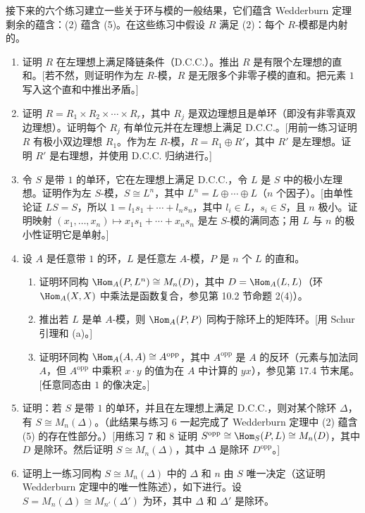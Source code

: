 接下来的六个练习建立一些关于环与模的一般结果，它们蕴含 Wedderburn 定理剩余的蕴含：(2) 蕴含 (5)。在这些练习中假设 $R$ 满足 (2)：每个 $R$-模都是内射的。
\begin{enumerate}[label=\arabic*.,resume]
  \item 证明 $R$ 在左理想上满足降链条件（D.C.C.）。推出 $R$ 是有限个左理想的直和。[若不然，则证明作为左 $R$-模，$R$ 是无限多个非零子模的直和。把元素 $1$ 写入这个直和中推出矛盾。]
  \item 证明 $R=R_1\times R_2\times\cdots\times R_r$，其中 $R_j$ 是双边理想且是单环（即没有非零真双边理想）。证明每个 $R_j$ 有单位元并在左理想上满足 D.C.C.。[用前一练习证明 $R$ 有极小双边理想 $R_1$。作为左 $R$-模，$R=R_1\oplus R'$，其中 $R'$ 是左理想。证明 $R'$ 是右理想，并使用 D.C.C. 归纳进行。]
  \item 令 $S$ 是带 $1$ 的单环，它在左理想上满足 D.C.C.，令 $L$ 是 $S$ 中的极小左理想。证明作为左 $S$-模，$S\cong L^n$，其中 $L^n=L\oplus\cdots\oplus L$（$n$ 个因子）。[由单性论证 $LS=S$，所以 $1=l_1s_1+\cdots+l_ns_n$，其中 $l_i\in L$，$s_i\in S$，且 $n$ 极小。证明映射 $(x_1,
  \ldots,x_n)\mapsto x_1s_1+\cdots+x_ns_n$ 是左 $S$-模的满同态；用 $L$ 与 $n$ 的极小性证明它是单射。]
  \item 设 $A$ 是任意带 $1$ 的环，$L$ 是任意左 $A$-模，$P$ 是 $n$ 个 $L$ 的直和。
  \begin{enumerate}[label=(\alph*)]
    \item 证明环同构 $\Hom_A(P,L^n)\cong M_n(D)$，其中 $D=\Hom_A(L,L)$（环 $\Hom_A(X,X)$ 中乘法是函数复合，参见第 10.2 节命题 2(4)）。
    \item 推出若 $L$ 是单 $A$-模，则 $\Hom_A(P,P)$ 同构于除环上的矩阵环。[用 Schur 引理和 (a)。]
    \item 证明环同构 $\Hom_A(A,A)\cong A^{\mathrm{opp}}$，其中 $A^{\mathrm{opp}}$ 是 $A$ 的反环（元素与加法同 $A$，但 $A^{\mathrm{opp}}$ 中乘积 $x\cdot y$ 的值为在 $A$ 中计算的 $yx$），参见第 17.4 节末尾。[任意同态由 $1$ 的像决定。]
  \end{enumerate}
  \item 证明：若 $S$ 是带 $1$ 的单环，并且在左理想上满足 D.C.C.，则对某个除环 $\Delta$，有 $S\cong M_n(\Delta)$。（此结果与练习 6 一起完成了 Wedderburn 定理中 (2) 蕴含 (5) 的存在性部分。）[用练习 7 和 8 证明 $S^{\mathrm{opp}}\cong\Hom_S(P,L)\cong M_n(D)$，其中 $D$ 是除环。然后证明 $S\cong M_n(\Delta)$，其中 $\Delta$ 是除环 $D^{\mathrm{opp}}$。]
  \item 证明上一练习同构 $S\cong M_n(\Delta)$ 中的 $\Delta$ 和 $n$ 由 $S$ 唯一决定（这证明 Wedderburn 定理中的唯一性陈述），如下进行。设 $S=M_n(\Delta)\cong M_{n'}(\Delta')$ 为环，其中 $\Delta$ 和 $\Delta'$ 是除环。

\end{enumerate}
